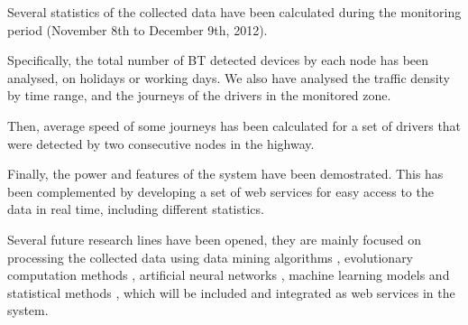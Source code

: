 \documentclass{llncs}
\begin{document}
Several statistics of the collected data have been calculated during the monitoring period (November 8th to December 9th, 2012).


Specifically, the total number of BT detected devices by each node has been analysed, on holidays or working days. 
We also have analysed the traffic density by time range, and the journeys of the drivers in the monitored zone.

Then, average speed of some journeys has been calculated for a set of drivers that were detected by two consecutive nodes in the highway.

Finally, the power and features of the system have been demostrated. This has been complemented by developing a set of web services for easy access to the data in real time, including different statistics.

Several future research lines have been opened, they are mainly focused on processing the collected data using data mining algorithms \cite{Trevor2009}, evolutionary computation methods \cite{Eiben2003,Michalewicz2004,Yang2010}, artificial neural networks \cite{Castillo2001,Rivas2003,Castillo2007}, machine learning models \cite{Arenas2005} and statistical methods \cite{Jiawei2006,Hill2007,Nisbet2009}, which will be included and integrated as web services \cite{Papazoglou2007,pgs2007} in the system.
\end{document}
